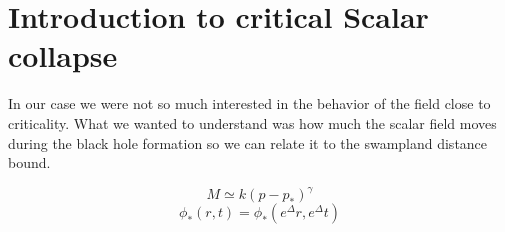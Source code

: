 \chapter{Introduction to critical Scalar collapse}

In our case we were not so much interested in the behavior of the field close to criticality. What we wanted to understand was how much the scalar field moves during the black hole formation so we can relate it to the swampland distance bound.

\begin{equation}M \simeq k\left(p-p_{*}\right)^{\gamma}\end{equation}
\begin{equation}\phi_{*}(r, t)=\phi_{*}\left(e^{\Delta} r, e^{\Delta} t\right)\end{equation}